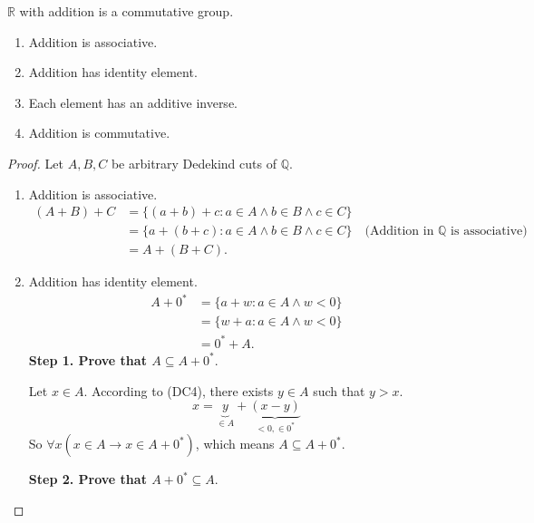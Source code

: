 \begin{theorem}\label{theorem:chapter1:real-field-part-one}
    $\mathbb{R}$ with addition is a commutative group.
    \begin{enumerate}[label={(F\arabic*)}]
        \item Addition is associative.
        \item Addition has identity element.
        \item Each element has an additive inverse.
        \item Addition is commutative.
    \end{enumerate}
\end{theorem}

\begin{proof}
    Let $A, B, C$ be arbitrary Dedekind cuts of $\mathbb{Q}$.
    \begin{enumerate}[label = (F\arabic*)]
        \item Addition is associative.
              \begin{align*}
                  (A + B) + C & = \{ (a + b) + c : a\in A\land b\in B\land c\in C \}                                                       \\
                              & = \{ a + (b + c) : a\in A\land b\in B\land c\in C \} \quad\text{(Addition in $\mathbb{Q}$ is associative)} \\
                              & = A + (B + C).
              \end{align*}
        \item Addition has identity element.
              \begin{align*}
                  A + {0}^{*} & = \{ a + w : a\in A\land w < 0 \} \\
                              & = \{ w + a : a\in A\land w < 0 \} \\
                              & = {0}^{*} + A.
              \end{align*}
              \textbf{Step 1. Prove that $A \subseteq A + {0}^{*}$}.

              Let $x\in A$. According to (DC4), there exists $y\in A$ such that $y > x$.
              \[
                  x = \underbrace{y}_{\in A} + \underbrace{(x - y)}_{< 0, \in {0}^{*}}
              \]
              So $\forall x(x\in A \rightarrow x\in A + {0}^{*})$, which means $A \subseteq A + {0}^{*}$.
              \bigskip

              \textbf{Step 2. Prove that $A + {0}^{*} \subseteq A$}.


\end{enumerate}
\end{proof}
